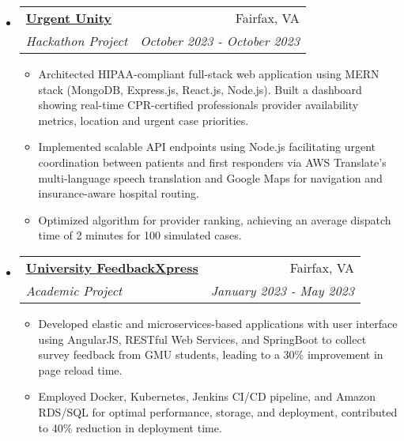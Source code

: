 \documentclass[letterpaper,10.8pt]{article}
\makeatletter
\newcommand{\resumeItem}[2]{
  \item\small{
    \textbf{#1}{: #2 \vspace{-2pt}}
  }
}
\newcommand{\resumeSubheading}[4]{
  \vspace{-1pt}\item
    \begin{tabular*}{0.97\textwidth}{l@{\extracolsep{\fill}}r}
      \textbf{#1} & #2 \\
      \textit{\small#3} & \textit{\small #4} \\
    \end{tabular*}\vspace{-5pt}
}
\newcommand{\resumeSubItem}[2]{\resumeItem{#1}{#2}\vspace{-4pt}}
\newcommand{\resumeSubHeadingListStart}{\begin{itemize}[leftmargin=*]}
\newcommand{\resumeSubHeadingListEnd}{\end{itemize}}
\newcommand{\resumeItemListStart}{\begin{itemize}}
\newcommand{\resumeItemListEnd}{\end{itemize}\vspace{-5pt}}
\makeatother
\begin{document}
 \resumeSubHeadingListStart
    \resumeSubheading
    {\href{https://github.com/a-verma26/Urgent-Unity}{Urgent Unity}} {Fairfax, VA}
    {Hackathon Project}    
 {October 2023 - October 2023}
    \resumeItemListStart
    \item {Architected HIPAA-compliant full-stack web application using MERN stack (MongoDB, Express.js, React.js, Node.js). Built a dashboard showing real-time CPR-certified professionals provider availability metrics, location and urgent case  priorities.}

    \item{Implemented scalable API endpoints using Node.js facilitating urgent coordination between patients and first responders via AWS Translate's multi-language speech translation and Google Maps for navigation and insurance-aware hospital routing.}
        \item{Optimized algorithm for provider ranking, achieving an average dispatch time of 2 minutes for 100 simulated cases.}
    

\resumeItemListEnd
\resumeSubHeadingListEnd
 \resumeSubHeadingListStart
    \resumeSubheading
    {\href{https://github.com/a-verma26/University-FeedbackXpress}{University FeedbackXpress}} {Fairfax, VA}
    {Academic Project} {January 2023 - May 2023}
    \resumeItemListStart
\item {Developed elastic and microservices-based applications with user interface using AngularJS, RESTful Web Services, and SpringBoot to collect survey feedback from GMU students, leading to a 30\% improvement in page reload time.}
\item {Employed Docker, Kubernetes, Jenkins CI/CD pipeline, and Amazon RDS/SQL for optimal performance, storage, and deployment, contributed to 40\% reduction in deployment time.
}
   
  
    \resumeItemListEnd
\resumeSubHeadingListEnd


\end{document}
